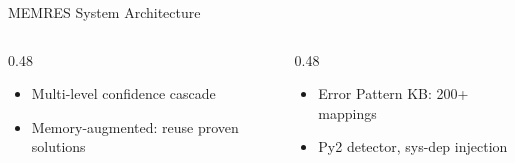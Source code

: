 \documentclass[aspectratio=169]{beamer}
\begin{document}
\begin{frame}{MEMRES System Architecture}
\begin{center}
\begin{tikzpicture}[
  scale=0.62, transform shape,
  node distance=0.4cm and 0.9cm,
  >=Stealth,
  every node/.style={font=\small},
  arrow/.style={->, very thick, navymid},
  dasharr/.style={->, thick, dashed},
]
\end{tikzpicture}
\end{center}

\vspace{-0.4em}
\begin{columns}[T]
\begin{column}{0.48\textwidth}
\begin{itemize}\small
  \item[\faLayerGroup] Multi-level confidence cascade
  \item[\faBrain] Memory-augmented: reuse proven solutions
\end{itemize}
\end{column}
\begin{column}{0.48\textwidth}
\begin{itemize}\small
  \item[\faBook] Error Pattern KB: 200+ mappings
  \item[\faPython] Py2 detector, sys-dep injection
\end{itemize}
\end{column}
\end{columns}
\end{frame}
\end{document}
